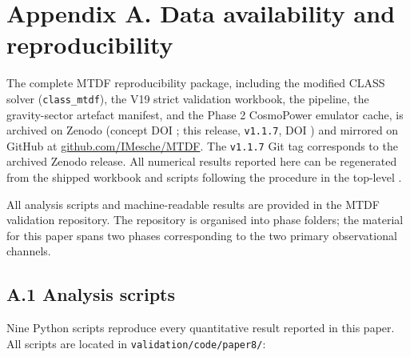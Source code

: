 \documentclass[11pt,a4paper]{article}
\begin{document}
\section{Appendix A. Data availability and reproducibility}
\label{sec:secA}
The complete MTDF reproducibility package, including the modified CLASS solver
(\texttt{class\_\allowbreak{}mtdf}), the V19 strict validation workbook, the
\texttt{{\small\protect{}}} pipeline, the gravity-sector artefact manifest,
and the Phase 2 CosmoPower emulator cache, is archived on Zenodo
(concept DOI \href{https://doi.org/10.5281/zenodo.19741058}{{\small\protect{}}};
this release, \texttt{v1.1.7}, DOI
\href{https://doi.org/10.5281/zenodo.21525855}{{\small\protect{}}})
and mirrored on GitHub at
\href{https://github.com/IMesche/MTDF}{github.com/\allowbreak{}IMesche/\allowbreak{}MTDF}.
The \texttt{v1.1.7} Git tag corresponds to the archived Zenodo release. All
numerical results reported here can be regenerated from the shipped workbook
and scripts following the procedure in the top-level \texttt{{\small\protect{}}}.

All analysis scripts and machine-readable results are provided in the MTDF validation repository. The repository is organised into phase folders; the material for this paper spans two phases corresponding to the two primary observational channels.

\subsection{A.1 Analysis scripts}
Nine Python scripts reproduce every quantitative result reported in this paper. All scripts are located in \texttt{validation/\allowbreak{}code/\allowbreak{}paper8/\allowbreak{}}:
\end{document}
